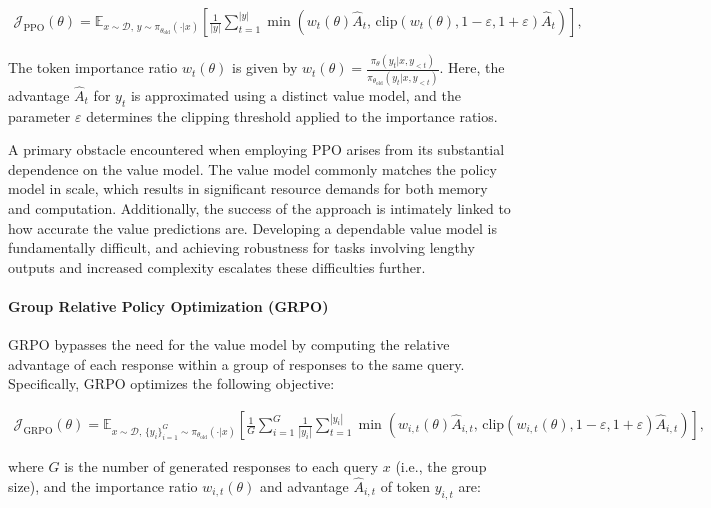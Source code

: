 \begin{align}
\mathcal{J}_\text{PPO}(\theta) = \mathbb{E}_{ x \sim \mathcal{D},\, y \sim \pi_{\theta_\text{old}}( \cdot | x) }
\left[ \frac{1}{|y|} \sum_{t=1}^{|y|} 
\min \left( w_{t}(\theta) \widehat{A}_{t},  \, \mathrm{clip} \left( w_{t}(\theta), 1 - {\varepsilon}, 1 + {\varepsilon}\right) \widehat{A}_{t} \right)
\right],
\end{align}

The token importance ratio $w_{t}(\theta)$ is given by $
w_{t}(\theta) = \frac{ \pi_{\theta} (y_{t} | x, y_{<t}) }{ \pi_{\theta_\text{old}} (y_{t} | x,y_{<t})} $. Here, the advantage $\widehat{A}_{t}$ for $y_t$ is approximated using a distinct value model, and the parameter $\varepsilon$ determines the clipping threshold applied to the importance ratios.

A primary obstacle encountered when employing PPO arises from its substantial dependence on the value model. The value model commonly matches the policy model in scale, which results in significant resource demands for both memory and computation. Additionally, the success of the approach is intimately linked to how accurate the value predictions are. Developing a dependable value model is fundamentally difficult, and achieving robustness for tasks involving lengthy outputs and increased complexity escalates these difficulties further.

\paragraph{Group Relative Policy Optimization (GRPO)} GRPO \citep{grpo} bypasses the need for the value model by computing the relative advantage of each response within a group of responses to the same query. Specifically, GRPO optimizes the following objective:

\begin{align}
\label{equ:grpo}
\mathcal{J}_\text{GRPO}(\theta) = \mathbb{E}_{ x \sim \mathcal{D},\, \{y_i\}_{i=1}^G \sim \pi_{\theta_\text{old}}( \cdot | x) }
\left[ \frac{1}{G} \sum_{i=1}^{G} \frac{1}{|y_i|} \sum_{t=1}^{|y_i|} 
\min \left( w_{i,t}(\theta) \widehat{A}_{i,t},  \, \mathrm{clip} \left( w_{i,t}(\theta), 1 - {\varepsilon}, 1 + {\varepsilon}\right) \widehat{A}_{i,t} \right)
\right],
\end{align}

where $G$ is the number of generated responses to each query $x$ (i.e., the group size), and the importance ratio $w_{i,t}(\theta)$ and advantage $\widehat{A}_{i,t}$ of token $y_{i,t}$ are:

